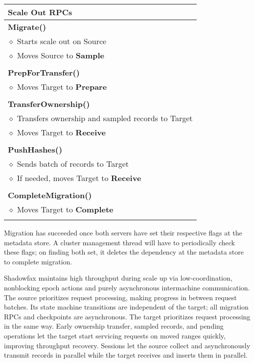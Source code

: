 \begin{table}[t]
\small
\begin{tabular}[]{p{}}
\toprule
\textbf{Scale Out RPCs} \\
\midrule
\textbf{Migrate()} \\
  \hspace{1em} $\diamond$ Starts scale out on Source \\
  \hspace{1em} $\diamond$ Moves Source to \textbf{Sample} \\
  \\
\textbf{PrepForTransfer()} \\
  \hspace{1em} $\diamond$ Moves Target to \textbf{Prepare} \\
  \\
\textbf{TransferOwnership()} \\
  \hspace{1em} $\diamond$ Transfers ownership
    and sampled records to Target \\
  \hspace{1em} $\diamond$ Moves Target to \textbf{Receive} \\
  \\
\textbf{PushHashes()} \\
  \hspace{1em} $\diamond$ Sends batch of records to Target \\
  \hspace{1em} $\diamond$ If needed, moves Target to \textbf{Receive} \\
  \\
\textbf{CompleteMigration()} \\
  \hspace{1em} $\diamond$ Moves Target to \textbf{Complete} \\
  \\
\bottomrule
\end{tabular}
\caption{}
\label{table:rpc}
\end{table}
\fi

Migration has succeeded once both servers have set their respective
flags at the metadata store.
%
A cluster management thread will have to periodically check these flags;
%
on finding both set, it deletes the
dependency at the metadata store to complete migration.

Shadowfax maintains high throughput during
scale up via low-coordination, nonblocking
epoch actions and purely asynchronous intermachine communication.
%
The source prioritizes request processing, making progress in between request batches.
%
Its state machine transitions are independent of the target; all
migration RPCs and checkpoints are asynchronous.
%
The target prioritizes request processing in the same way.
%
Early ownership transfer, sampled records, and pending operations
let the target start servicing requests on moved ranges
quickly, improving throughput recovery.
%
Sessions let the source collect and
asynchronously transmit records in parallel while the target receives
and inserts them in parallel.

